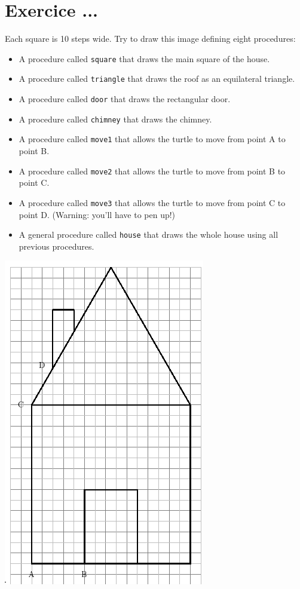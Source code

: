 \section{Exercice ...}
\noindent Each square is 10 steps wide. Try to draw this image defining eight procedures:
\begin{itemize}
\item A procedure called \texttt{square} that draws the main square of the house.
\item A procedure called \texttt{triangle} that draws the roof as an equilateral triangle.
\item A procedure called \texttt{door} that draws the rectangular door.
\item A procedure called \texttt{chimney} that draws the chimney.
\item A procedure called \texttt{move1} that allows the turtle to move from point A to point B.
\item A procedure called \texttt{move2} that allows the turtle to move from point B to point C.
\item A procedure called \texttt{move3} that allows the turtle to move from point C to point D. (Warning: you'll have to pen up!)
\item A general procedure called  \texttt{house} that draws the whole house using all previous procedures.
\end{itemize}
\label{maison}
\begin{center}
\includegraphics[scale=0.6]{pics/bases-maison.png}
\end{center}